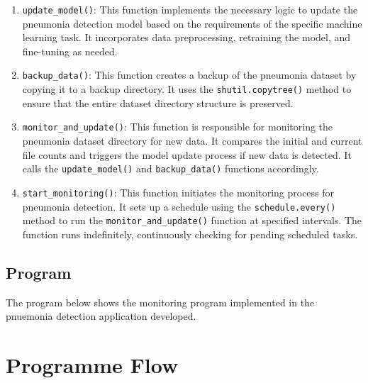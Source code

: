 \begin{enumerate}
	\item \texttt{update\_model()}: This function implements the necessary logic to update the pneumonia detection model based on the requirements of the specific machine learning task. It incorporates data preprocessing, retraining the model, and fine-tuning as needed.
	\item \texttt{backup\_data()}: This function creates a backup of the pneumonia dataset by copying it to a backup directory. It uses the \texttt{shutil.copytree()} method to ensure that the entire dataset directory structure is preserved.
	\item \texttt{monitor\_and\_update()}: This function is responsible for monitoring the pneumonia dataset directory for new data. It compares the initial and current file counts and triggers the model update process if new data is detected. It calls the \texttt{update\_model()} and \texttt{backup\_data()} functions accordingly.
	\item \texttt{start\_monitoring()}: This function initiates the monitoring process for pneumonia detection. It sets up a schedule using the \texttt{schedule.every()} method to run the \texttt{monitor\_and\_update()} function at specified intervals. The function runs indefinitely, continuously checking for pending scheduled tasks.
\end{enumerate}

\section{Program}

The program below shows the monitoring program implemented in the pnuemonia detection application developed.




\chapter{Programme Flow}
	

